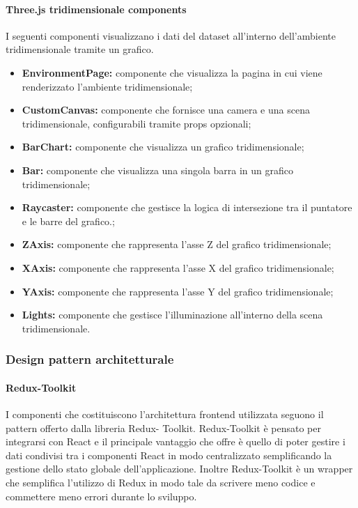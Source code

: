 \paragraph{Three.js tridimensionale components}
    I seguenti componenti visualizzano i dati del dataset all'interno dell'ambiente tridimensionale tramite un grafico.
    \begin{itemize}
        \item \textbf{EnvironmentPage:} componente che visualizza la pagina in cui viene renderizzato l'ambiente tridimensionale;
        \item \textbf{CustomCanvas:} componente che fornisce una camera e una scena tridimensionale, configurabili tramite props opzionali;
        \item \textbf{BarChart:} componente che visualizza un grafico tridimensionale;
        \item \textbf{Bar:} componente che visualizza una singola barra in un grafico tridimensionale;
        \item \textbf{Raycaster:} componente che gestisce la logica di intersezione tra il puntatore e le barre del grafico.;
        \item \textbf{ZAxis:} componente che rappresenta l'asse Z del grafico tridimensionale;
        \item \textbf{XAxis:} componente che rappresenta l'asse X del grafico tridimensionale;
        \item \textbf{YAxis:} componente che rappresenta l'asse Y del grafico tridimensionale;
        \item \textbf{Lights:} componente che gestisce l'illuminazione all'interno della scena tridimensionale.
    \end{itemize}

\subsubsection{Design pattern architetturale}

\paragraph{Redux-Toolkit}
I componenti che costituiscono l’architettura frontend utilizzata seguono il pattern offerto dalla libreria Redux-
Toolkit.
Redux-Toolkit è pensato per integrarsi con React e il principale vantaggio che offre è quello di poter
gestire i dati condivisi tra i componenti React in modo centralizzato semplificando la gestione dello stato
globale dell’applicazione.
Inoltre Redux-Toolkit è un wrapper che semplifica l'utilizzo di Redux in modo tale da scrivere meno codice e commettere meno errori durante lo sviluppo.


